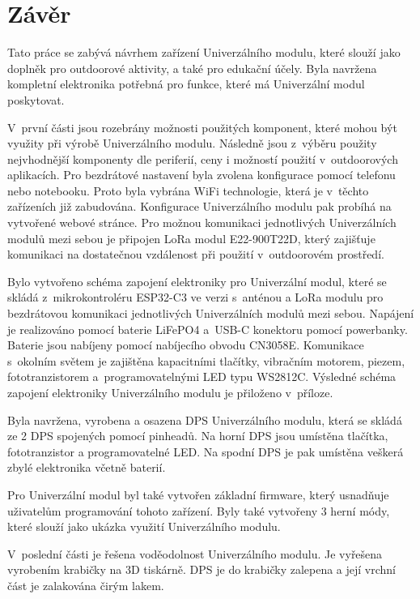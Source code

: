\chapter*{Závěr}
{}
Tato práce se zabývá návrhem zařízení Univerzálního modulu, které slouží jako doplněk pro outdoorové aktivity, a také pro edukační účely. Byla navržena kompletní 
elektronika potřebná pro funkce, které má Univerzální modul poskytovat. 

V~první části jsou rozebrány možnosti použitých komponent, které mohou být využity při výrobě Univerzálního modulu. Následně jsou z~výběru použity 
nejvhodnější komponenty dle periferií, ceny i možností použití v~outdoorových aplikacích. Pro bezdrátové nastavení byla zvolena konfigurace pomocí telefonu nebo 
notebooku. Proto byla vybrána WiFi technologie, která je v~těchto zařízeních již zabudována. Konfigurace Univerzálního modulu pak probíhá na vytvořené webové stránce. 
Pro možnou komunikaci jednotlivých Univerzálních modulů mezi sebou je připojen LoRa modul E22-900T22D, který zajišťuje komunikaci na dostatečnou vzdálenost při použití 
v~outdoorovém prostředí. 

Bylo vytvořeno schéma zapojení elektroniky pro Univerzální modul, které se skládá z~mikrokontroléru ESP32-C3 ve verzi s~anténou a LoRa modulu pro 
bezdrátovou komunikaci jednotlivých Univerzálních modulů mezi sebou. Napájení je realizováno pomocí baterie LiFePO4 a~USB-C konektoru pomocí powerbanky. Baterie 
jsou nabíjeny pomocí nabíjecího obvodu CN3058E. Komunikace s~okolním světem je zajištěna kapacitními tlačítky, 
vibračním motorem, piezem, fototranzistorem a~programovatelnými LED typu WS2812C. Výsledné schéma zapojení elektroniky Univerzálního modulu je přiloženo v~příloze. 

Byla navržena, vyrobena a osazena DPS Univerzálního modulu, která se skládá ze 2 DPS spojených pomocí pinheadů. Na horní DPS jsou umístěna tlačítka, fototranzistor 
a programovatelné LED. Na spodní DPS je pak umístěna veškerá zbylé elektronika včetně baterií. 

Pro Univerzální modul byl také vytvořen základní firmware, který usnadňuje uživatelům programování tohoto zařízení. Byly také vytvořeny 3 herní módy, které slouží jako ukázka 
využití Univerzálního modulu. 

V~poslední části je řešena voděodolnost Univerzálního modulu. Je vyřešena vyrobením krabičky na 3D tiskárně. DPS je do krabičky zalepena a její vrchní část je zalakována čirým
lakem. 
